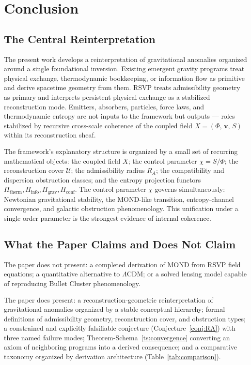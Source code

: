 \documentclass[11pt, a4paper]{article}
\theoremstyle{plain}
\theoremstyle{definition}
\theoremstyle{remark}
\newcommand{\Xfield}{X = (\Phi,\,\mathbf{v},\,S)}
\newcommand{\RA}{R_{\!A}}
\newcommand{\Ucover}{\mathcal{U}}
\newcommand{\Pitherm}{\Pi_{\mathrm{therm}}}
\newcommand{\Piinfo}{\Pi_{\mathrm{info}}}
\newcommand{\Pigrav}{\Pi_{\mathrm{grav}}}
\newcommand{\Piconf}{\Pi_{\mathrm{conf}}}
\begin{document}
\section{Conclusion}
\label{sec:conclusion}

\subsection{The Central Reinterpretation}

The present work develops a reinterpretation of gravitational anomalies organized
around a single foundational inversion. Existing emergent gravity programs treat
physical exchange, thermodynamic bookkeeping, or information flow as primitive and
derive spacetime geometry from them. RSVP treats admissibility geometry as primary
and interprets persistent physical exchange as a stabilized reconstruction mode.
Emitters, absorbers, particles, force laws, and thermodynamic entropy are not inputs
to the framework but outputs --- roles stabilized by recursive cross-scale coherence
of the coupled field $\Xfield$ within its reconstruction sheaf.

The framework's explanatory structure is organized by a small set of recurring
mathematical objects: the coupled field $X$; the control parameter $\chi = S/\Phi$;
the reconstruction cover $\Ucover$; the admissibility radius $\RA$; the
compatibility and dispersion obstruction classes; and the entropy projection functors
$\Pitherm, \Piinfo, \Pigrav, \Piconf$. The control parameter $\chi$ governs
simultaneously: Newtonian gravitational stability, the MOND-like transition,
entropy-channel convergence, and galactic obstruction phenomenology. This unification
under a single order parameter is the strongest evidence of internal coherence.

\subsection{What the Paper Claims and Does Not Claim}

The paper does not present: a completed derivation of MOND from RSVP field equations;
a quantitative alternative to $\Lambda$CDM; or a solved lensing model capable of
reproducing Bullet Cluster phenomenology.

The paper does present: a reconstruction-geometric reinterpretation of gravitational
anomalies organized by a stable conceptual hierarchy; formal definitions of
admissibility geometry, reconstruction cover, and obstruction types; a constrained
and explicitly falsifiable conjecture (Conjecture~\ref{conj:RA}) with three named
failure modes; Theorem-Schema~\ref{ts:convergence} converting an axiom of neighboring
programs into a derived consequence; and a comparative taxonomy organized by
derivation architecture (Table~\ref{tab:comparison}).
\end{document}
